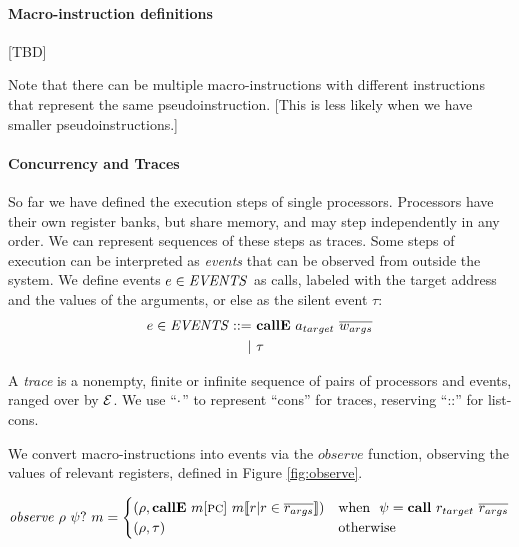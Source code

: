 \documentclass[10pt,conference]{ieeetran}%
\theoremstyle{definition}
\begin{document}
\paragraph*{Macro-instruction definitions}

[TBD]

Note that there can be multiple macro-instructions with different instructions
that represent the same pseudoinstruction.
[This is less likely when we have smaller pseudoinstructions.]

\paragraph*{Concurrency and Traces}

So far we have defined the execution steps of single processors. Processors
have their own register banks, but share memory, and may step independently
in any order. We can represent sequences of these steps as traces.
Some steps of execution can be interpreted as {\it events} that can be observed
from outside the system. We define events \(e \in \mathit{EVENTS}\) as calls, labeled
with the target address and the values of the arguments, or else as the silent
event \(\tau\):
\[\begin{split}
e \in \mathit{EVENTS} ::= & ~ \mathbf{callE} ~ a_{target} ~ \overline{w_{args}} \\
| & ~ \tau \\
\end{split}\]

A {\em trace} is a nonempty, finite or infinite sequence
of pairs of processors and events, ranged over by \(\mathcal{E}\).
We use ``\(\cdot\)'' to represent ``cons'' for traces, reserving ``::''
for list-cons.

We convert macro-instructions into events via the \(\mathit{observe}\)
function, observing the values of relevant registers, defined in Figure \ref{fig:observe}.

\begin{figure*}
\[\mathit{observe} ~ \rho ~ \psi? ~ m =
\begin{cases}
  (\rho, \mathbf{callE} ~ m[\textsc{pc}] ~ m \llbracket r | r \in \overline{r_{args}} \rrbracket)
  & \textnormal{when } ~ \psi = \mathbf{call} ~ r_{target} ~ \overline{r_{args}} \\
  (\rho, \tau) & \textnormal{otherwise} \\
\end{cases}\]
\caption{Converting overlay steps to events}
\label{fig:observe}
\end{figure*}
\end{document}
